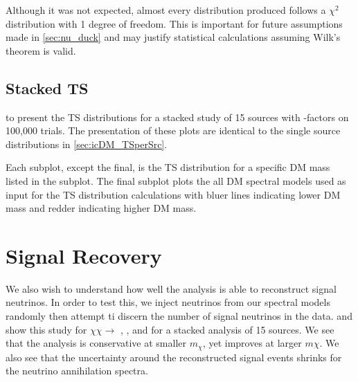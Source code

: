 Although it was not expected, almost every distribution produced follows a $\chi^2$ distribution with 1 degree of freedom.
This is important for future assumptions made in \cref{sec:nu_duck} and may justify statistical calculations assuming Wilk's theorem is valid.

\subsection{Stacked TS} \label{sec:icDM_TSstacked}


 to  present the TS distributions for a stacked study of 15 sources with \GS \J-factors on 100,000 trials.
The presentation of these plots are identical to the single source distributions in \cref{sec:icDM_TSperSrc}.

Each subplot, except the final, is the TS distribution for a specific DM mass listed in the subplot.
The final subplot plots the all DM spectral models used as input for the TS distribution calculations with bluer lines indicating lower DM mass and redder indicating higher DM mass.

\section{Signal Recovery} \label{sec:icDM_sig_recovery}

We also wish to understand how well the analysis is able to reconstruct signal neutrinos.
In order to test this, we inject neutrinos from our spectral models randomly then attempt ti discern the number of signal neutrinos in the data.
 and  show this study for $\chi\chi \rightarrow$ , , and \parpar{\nu_\mu} for a stacked analysis of 15 sources.
We see that the analysis is conservative at smaller $m_\chi$, yet improves at larger $m\chi$.
We also see that the uncertainty around the reconstructed signal events shrinks for the neutrino annihilation spectra.

